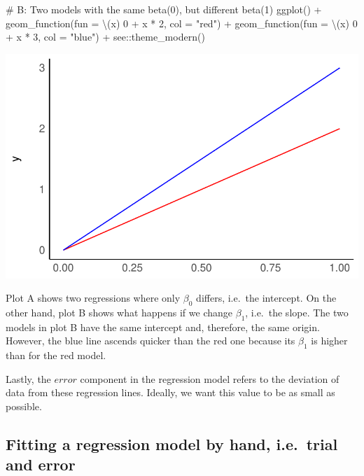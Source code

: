 \documentclass[
  letterpaper,
]{krantz}
\makeatletter
\newenvironment{Shaded}{\begin{snugshade}}{\end{snugshade}}
\newcommand{\AttributeTok}[1]{\textcolor[rgb]{0.40,0.45,0.13}{#1}}
\newcommand{\CommentTok}[1]{\textcolor[rgb]{0.37,0.37,0.37}{#1}}
\newcommand{\DecValTok}[1]{\textcolor[rgb]{0.68,0.00,0.00}{#1}}
\newcommand{\FunctionTok}[1]{\textcolor[rgb]{0.28,0.35,0.67}{#1}}
\newcommand{\NormalTok}[1]{\textcolor[rgb]{0.00,0.23,0.31}{#1}}
\newcommand{\SpecialCharTok}[1]{\textcolor[rgb]{0.37,0.37,0.37}{#1}}
\newcommand{\StringTok}[1]{\textcolor[rgb]{0.13,0.47,0.30}{#1}}
\newenvironment{kframe}{%
\medskip{}
\setlength{\fboxsep}{.8em}
 \def\at@end@of@kframe{}%
 \ifinner\ifhmode%
  \def\at@end@of@kframe{\end{minipage}}%
  \begin{minipage}{\columnwidth}%
 \fi\fi%
 \def\FrameCommand##1{\hskip\@totalleftmargin \hskip-\fboxsep
 \colorbox{shadecolor}{##1}\hskip-\fboxsep
     \hskip-\linewidth \hskip-\@totalleftmargin \hskip\columnwidth}%
 \MakeFramed {\advance\hsize-\width
   \@totalleftmargin\z@ \linewidth\hsize
   \@setminipage}}%
 {\par\unskip\endMakeFramed%
 \at@end@of@kframe}
\renewenvironment{Shaded}{\begin{kframe}}{\end{kframe}}
\makeatother
\begin{document}
\begin{Shaded}
\begin{Highlighting}[]
\CommentTok{\# B: Two models with the same beta(0), but different beta(1)}
\FunctionTok{ggplot}\NormalTok{() }\SpecialCharTok{+}
  \FunctionTok{geom\_function}\NormalTok{(}\AttributeTok{fun =}\NormalTok{ \textbackslash{}(x) }\DecValTok{0} \SpecialCharTok{+}\NormalTok{ x }\SpecialCharTok{*} \DecValTok{2}\NormalTok{, }\AttributeTok{col =} \StringTok{"red"}\NormalTok{) }\SpecialCharTok{+}
  \FunctionTok{geom\_function}\NormalTok{(}\AttributeTok{fun =}\NormalTok{ \textbackslash{}(x) }\DecValTok{0} \SpecialCharTok{+}\NormalTok{ x }\SpecialCharTok{*} \DecValTok{3}\NormalTok{, }\AttributeTok{col =} \StringTok{"blue"}\NormalTok{) }\SpecialCharTok{+}
\NormalTok{  see}\SpecialCharTok{::}\FunctionTok{theme\_modern}\NormalTok{()}
\end{Highlighting}
\end{Shaded}

\includegraphics{13_regressions_files/figure-latex/beta-zero-beta-one-explained-diff-1.pdf}

Plot A shows two regressions where only \(\beta_0\) differs, i.e.~the
intercept. On the other hand, plot B shows what happens if we change
\(\beta_1\), i.e.~the slope. The two models in plot B have the same
intercept and, therefore, the same origin. However, the blue line
ascends quicker than the red one because its \(\beta_1\) is higher than
for the red model.

Lastly, the \(error\) component in the regression model refers to the
deviation of data from these regression lines. Ideally, we want this
value to be as small as possible.

\subsection{Fitting a regression model by hand, i.e.~trial and
error}\label{sec-fitting-a-regression-model-by-hand}
\end{document}
